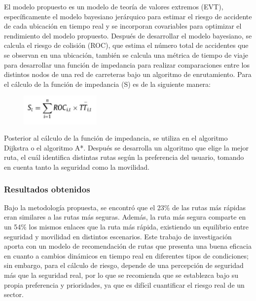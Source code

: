 El modelo propuesto es un modelo de teoría de valores extremos (EVT), específicamente el modelo bayesiano jerárquico para estimar el riesgo de accidente de cada ubicación en tiempo real y se incorporan covariables para optimizar el rendimiento del modelo propuesto. Después de desarrollar el modelo bayesiano, se calcula el riesgo de colisión (ROC), que estima el número total de accidentes que se observan en una ubicación, también se calcula una métrica de tiempo de viaje para desarrollar una función de impedancia para realizar comparaciones entre los distintos nodos de una red de carreteras bajo un algoritmo de enrutamiento. Para el cálculo de la función de impedancia (S) es de la siguiente manera:
\begin{figure}[h]
	\begin{center}
		\includegraphics[width=0.35\textwidth]{2/figures/roc.jpg}
	\end{center}
\end{figure}
Posterior al cálculo de la función de impedancia, se utiliza en el algoritmo Dijkstra o el algoritmo A*. Después se desarrolla un algoritmo que elige la mejor ruta, el cuál identifica distintas rutas según la preferencia del usuario, tomando en cuenta tanto la seguridad como la movilidad.

\subsubsection{Resultados obtenidos}
Bajo la metodología propuesta, se encontró que el 23\% de las rutas más rápidas eran similares a las rutas más seguras. Además, la ruta más segura comparte en un 54\% los mismos enlaces que la ruta más rápida, existiendo un equilibrio entre seguridad y movilidad en distintos escenarios. Este trabajo de investigación aporta con un modelo de recomendación de rutas que presenta una buena eficacia en cuanto a cambios dinámicos en tiempo real en diferentes tipos de condiciones; sin embargo, para el cálculo de riesgo, depende de una percepción de seguridad más que la seguridad real, por lo que se recomienda que se establezca bajo su propia preferencia y prioridades, ya que es difícil cuantificar el riesgo real de un sector.

